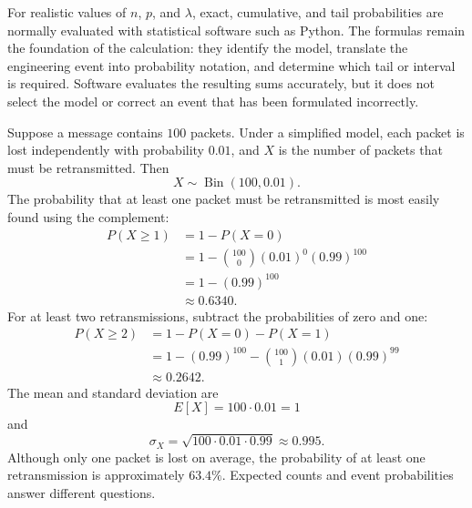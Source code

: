 For realistic values of $n$, $p$, and $\lambda$, exact, cumulative, and tail probabilities are normally evaluated with statistical software such as Python. The formulas remain the foundation of the calculation: they identify the model, translate the engineering event into probability notation, and determine which tail or interval is required. Software evaluates the resulting sums accurately, but it does not select the model or correct an event that has been formulated incorrectly.

\begin{example}\par
Suppose a message contains $100$ packets. Under a simplified model, each packet is lost independently with probability $0.01$, and $X$ is the number of packets that must be retransmitted. Then
\[
X\sim\operatorname{Bin}(100,0.01).
\]
The probability that at least one packet must be retransmitted is most easily found using the complement:
\[
\begin{aligned}
P(X\geq1)
&=1-P(X=0)\\
&=1-\binom{100}{0}(0.01)^0(0.99)^{100}\\
&=1-(0.99)^{100}\\
&\approx0.6340.
\end{aligned}
\]
For at least two retransmissions, subtract the probabilities of zero and one:
\[
\begin{aligned}
P(X\geq2)
&=1-P(X=0)-P(X=1)\\
&=1-(0.99)^{100}
-\binom{100}{1}(0.01)(0.99)^{99}\\
&\approx0.2642.
\end{aligned}
\]
The mean and standard deviation are
\[
E[X]=100\cdot0.01=1
\]
and
\[
\sigma_X=\sqrt{100\cdot0.01\cdot0.99}\approx0.995.
\]
Although only one packet is lost on average, the probability of at least one retransmission is approximately $63.4\%$. Expected counts and event probabilities answer different questions.
\end{example}

